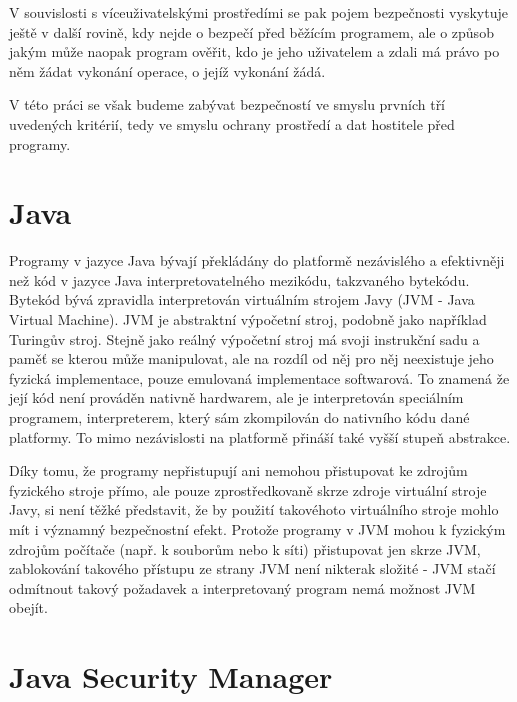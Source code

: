 V souvislosti s víceuživatelskými prostředími se pak pojem bezpečnosti vyskytuje ještě v další rovině, kdy nejde o bezpečí před běžícím programem, ale o způsob jakým může naopak program ověřit, kdo je jeho uživatelem a zdali má právo po něm žádat vykonání operace, o jejíž vykonání žádá.

V této práci se však budeme zabývat bezpečností ve smyslu prvních tří uvedených kritérií, tedy ve smyslu ochrany prostředí a dat hostitele před programy.

\section{Java}

Programy v jazyce Java bývají překládány do platformě nezávislého a efektivněji než kód v jazyce Java interpretovatelného mezikódu, takzvaného bytekódu.
Bytekód bývá zpravidla interpretován virtuálním strojem Javy (JVM - Java Virtual Machine).
JVM je abstraktní výpočetní stroj, podobně jako například Turingův stroj.
Stejně jako reálný výpočetní stroj má svoji instrukční sadu a paměť se kterou může manipulovat, ale na rozdíl od něj pro něj neexistuje jeho fyzická implementace, pouze emulovaná implementace softwarová.
To znamená že její kód není prováděn nativně hardwarem, ale je interpretován speciálním programem, interpreterem, který sám zkompilován do nativního kódu dané platformy.
To mimo nezávislosti na platformě přináší také vyšší stupeň abstrakce.

Díky tomu, že programy nepřistupují ani nemohou přistupovat ke zdrojům fyzického stroje přímo, ale pouze zprostředkovaně skrze zdroje virtuální stroje Javy, si není těžké představit, že by použití takovéhoto virtuálního stroje mohlo mít i významný bezpečnostní efekt.
Protože programy v JVM mohou k fyzickým zdrojům počítače (např. k souborům nebo k síti) přistupovat jen skrze JVM, zablokování takového přístupu ze strany JVM není nikterak složité - JVM stačí odmítnout takový požadavek a interpretovaný program nemá možnost JVM obejít.

\section{Java Security Manager}

